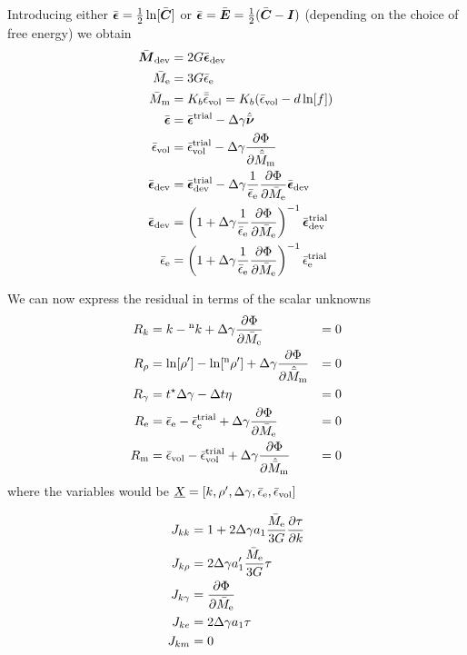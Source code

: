 \documentclass[a4paper,11pt]{article}
\newcommand{\ts}[1]{\text{\boldmath $#1$}}
\newcommand{\pderiv}[2]{\frac{\partial #1}{\partial #2}}
\newcommand{\dev}{{\rm dev}}
\newcommand{\vol}{{\rm vol}}
\newcommand{\trial}{{\rm trial}}
\newcommand{\rme}{{\rm e}}
\newcommand{\rmm}{{\rm m}}
\newcommand{\old}{{}^{\rm n}}
\begin{document}
Introducing  either $\bar{\ts\epsilon} =\frac12\ln[\bar{\ts C}]$ or $\bar{\ts\epsilon} = \bar{\ts E} = \frac12(\bar{\ts C} - \ts I)$ (depending on the choice of free energy) we obtain
\begin{align*}
	\bar{\ts M}_\dev &= 2G\bar{\ts\epsilon}_\dev\\
	\bar M_\rme &= 3G\bar{\epsilon}_\rme\\
	\bar M_\rmm &= K_b\bar{\bar{\epsilon}}_\vol = K_b(\bar\epsilon_\vol - d \ln[f])\\
	\bar{\ts\epsilon} &= \bar{\ts\epsilon}^\trial - \Delta\gamma\hat{\bar{\ts\nu}}\\
	\bar{\epsilon}_\vol &= \bar{\epsilon}^\trial_\vol - 
		 \Delta\gamma\pderiv{\Phi}{\hat{\bar M}_\rmm}\\
	\bar{\ts\epsilon}_\dev &= \bar{\ts\epsilon}^\trial_\dev - 
		\Delta\gamma\frac{1}{\bar{\epsilon}_\rme}\pderiv{\Phi}{\bar{M}_\rme}\bar{\ts\epsilon}_\dev\\
	\bar{\ts\epsilon}_\dev &= \left(1+\Delta\gamma\frac{1}{\bar{\epsilon}_\rme}\pderiv{\Phi}{\bar{M}_\rme}\right)^{-1}\bar{\ts\epsilon}^\trial_\dev\\
	\bar{\epsilon}_\rme &= \left(1+\Delta\gamma\frac{1}{\bar{\epsilon}_\rme}\pderiv{\Phi}{\bar{M}_\rme}\right)^{-1}\bar{\epsilon}^\trial_\rme
\end{align*}

We can now express the residual in terms of the scalar unknowns
\begin{align*}
	R_k &= k - \old k + \Delta\gamma \pderiv{\Phi}{\bar M_\rme} &= 0\\
	R_\rho &= \ln[\rho']-\ln[\old\rho']+\Delta\gamma\pderiv{\Phi}{\hat{\bar M}_\rmm} &= 0\\
	R_\gamma &= t^\star \Delta\gamma - \Delta t \eta &= 0\\
	R_\rme &= \bar\epsilon_\rme - \bar \epsilon_\rme^\trial + \Delta\gamma \pderiv{\Phi}{\bar M_\rme}&= 0\\
	R_\rmm &= \bar\epsilon_\vol - \bar \epsilon_\vol^\trial + \Delta\gamma \pderiv{\Phi}{\hat{\bar M}_\rmm}&= 0
\end{align*}
where the variables would be $\underline{X} = [k, \rho', \Delta\gamma, \bar \epsilon_\rme, \bar\epsilon_\vol]$

\begin{align*}
	J_{kk} &= 1 + 2\Delta\gamma a_1\frac{\bar M_\rme}{3G}\pderiv{\tau}{k}\\ %
	J_{k\rho} &= 2\Delta\gamma a_1' \frac{\bar M_\rme}{3G} \tau\\ %
	J_{k\gamma} &= \pderiv{\Phi}{\bar M_\rme}\\
	J_{ke} &= 2\Delta\gamma a_1\tau\\
	J_{km} &= 0
\end{align*}
\end{document}
